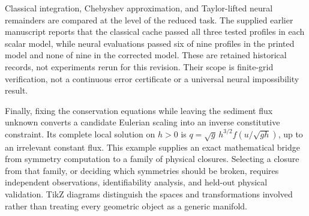 \documentclass[11pt,a4paper,oneside]{report}
\numberwithin{equation}{chapter}
\begin{document}
Classical integration, Chebyshev approximation, and Taylor-lifted neural remainders are compared at the level of the reduced task. The supplied earlier manuscript reports that the classical cache passed all three tested profiles in each scalar model, while neural evaluations passed six of nine profiles in the printed model and none of nine in the corrected model. These are retained historical records, not experiments rerun for this revision. Their scope is finite-grid verification, not a continuous error certificate or a universal neural impossibility result.

Finally, fixing the conservation equations while leaving the sediment flux unknown converts a candidate Eulerian scaling into an inverse constitutive constraint. Its complete local solution on $h>0$ is $q=\sqrt g\,h^{3/2}f(u/\sqrt{gh})$, up to an irrelevant constant flux. This example supplies an exact mathematical bridge from symmetry computation to a family of physical closures. Selecting a closure from that family, or deciding which symmetries should be broken, requires independent observations, identifiability analysis, and held-out physical validation. TikZ diagrams distinguish the spaces and transformations involved rather than treating every geometric object as a generic manifold.
\end{document}
